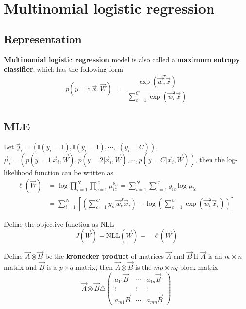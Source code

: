 \section{Multinomial logistic regression}


\subsection{Representation}
\textbf{Multinomial logistic regression} model is also called a \textbf{maximum entropy classifier}, which has the following form
\begin{align}
p(y=c|\vec{x},\vec{W}) & =\dfrac{\exp(\vec{w}_c^T\vec{x})}{\sum_{c=1}^C \exp(\vec{w}_c^T\vec{x})}
\end{align}


\subsection{MLE}
Let $\vec{y}_i=(\mathbb{I}(y_i=1),\mathbb{I}(y_i=1),\cdots, \mathbb{I}(y_i=C))$, $\vec{\mu}_i=(p(y=1|\vec{x}_i,\vec{W}),p(y=2|\vec{x}_i,\vec{W}),\cdots, p(y=C|\vec{x}_i,\vec{W}))$, then the log-likelihood function can be written as
\begin{align}
\ell(\vec{W}) & =\log\prod\limits_{i=1}^N\prod\limits_{c=1}^C \mu_{ic}^{y_{ic}}=\sum\limits_{i=1}^N\sum\limits_{c=1}^C y_{ic}\log \mu_{ic} \\
     & = \sum\limits_{i=1}^N\left[\left(\sum\limits_{c=1}^C y_{ic}\vec{w}_c^T\vec{x}_i\right)-\log\left(\sum\limits_{c=1}^C \exp(\vec{w}_c^T\vec{x}_i)\right)\right]
\end{align}

Define the objective function as NLL
\begin{equation}
J(\vec{W})=\mathrm{NLL}(\vec{W})=-\ell(\vec{W})
\end{equation}

Define $\vec{A} \otimes \vec{B}$ be the \textbf{kronecker product} of matrices $\vec{A}$ and $\vec{B}$.If $\vec{A}$ is an $m \times n$ matrix and $\vec{B}$ is a $p \times q$ matrix, then $\vec{A} \otimes \vec{B}$ is the $mp \times nq$ block matrix
\begin{equation}
\vec{A} \otimes \vec{B} \triangle \left(\begin{array}{ccc}
a_{11}\vec{B} & \cdots & a_{1n}\vec{B} \\
\vdots & \vdots & \vdots \\
a_{m1}\vec{B} & \cdots & a_{mn}\vec{B}
\end{array}\right)
\end{equation}

